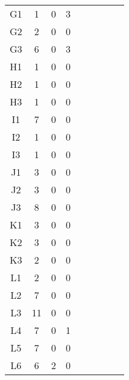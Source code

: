 \begin{center}
\begin{longtable}{ccccc|cccc}
G1    & 1     & 0     & 3 \\
G2    & 2     & 0     & 0 \\
G3    & 6     & 0     & 3 \\
H1    & 1     & 0     & 0 \\
H2    & 1     & 0     & 0 \\
H3    & 1     & 0     & 0 \\
I1    & 7     & 0     & 0 \\
I2    & 1     & 0     & 0 \\
I3    & 1     & 0     & 0 \\
J1    & 3     & 0     & 0 \\
J2    & 3     & 0     & 0 \\
J3    & 8     & 0     & 0 \\
K1    & 3     & 0     & 0 \\
K2    & 3     & 0     & 0 \\
K3    & 2     & 0     & 0 \\
L1    & 2     & 0     & 0 \\
L2    & 7     & 0     & 0 \\
L3    & 11    & 0     & 0 \\
L4    & 7     & 0     & 1 \\
L5    & 7     & 0     & 0 \\
L6    & 6     & 2     & 0 \\
\end{longtable}
\end{center}

